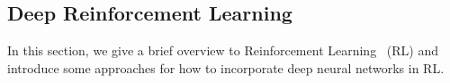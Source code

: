 \subsection{Deep Reinforcement Learning}

In this section, we give a brief overview to Reinforcement Learning~\cite{sutton2018reinforcement} (RL) and introduce some approaches for how to incorporate deep neural networks in RL. 











